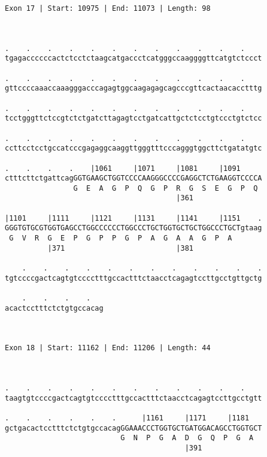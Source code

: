 \documentclass{article}
\begin{document}
\begin{Verbatim}
Exon 17 | Start: 10975 | End: 11073 | Length: 98



.    .    .    .    .    .    .    .    .    .    .    .    
tgagaccccccactctcctctaagcatgaccctcatgggccaaggggttcatgtctccct
                                                            
.    .    .    .    .    .    .    .    .    .    .    .    
gttccccaaaccaaagggacccagagtggcaagagagcagcccgttcactaacacctttg
                                                            
.    .    .    .    .    .    .    .    .    .    .    .    
tcctgggttctccgtctctgatcttagagtcctgatcattgctctcctgtccctgtctcc
                                                            
.    .    .    .    .    .    .    .    .    .    .    .    
ccttcctcctgccatcccgagaggcaaggttgggtttcccagggtggcttctgatatgtc
                                                            
.    .    .    .    |1061     |1071     |1081     |1091     
ctttcttctgattcagGGTGAAGCTGGTCCCCAAGGGCCCCGAGGCTCTGAAGGTCCCCA
                G  E  A  G  P  Q  G  P  R  G  S  E  G  P  Q 
                                        |361                
  
|1101     |1111     |1121     |1131     |1141     |1151    .
GGGTGTGCGTGGTGAGCCTGGCCCCCCTGGCCCTGCTGGTGCTGCTGGCCCTGCTgtaag
 G  V  R  G  E  P  G  P  P  G  P  A  G  A  A  G  P  A       
          |371                          |381                
  
    .    .    .    .    .    .    .    .    .    .    .    .
tgtccccgactcagtgtcccctttgccactttctaacctcagagtccttgcctgttgctg
                                                            
    .    .    .    .   
acactcctttctctgtgccacag
                       
                       
 
Exon 18 | Start: 11162 | End: 11206 | Length: 44



.    .    .    .    .    .    .    .    .    .    .    .    
taagtgtccccgactcagtgtcccctttgccactttctaacctcagagtccttgcctgtt
                                                            
.    .    .    .    .    .      |1161     |1171     |1181   
gctgacactcctttctctgtgccacagGGAAACCCTGGTGCTGATGGACAGCCTGGTGCT
                           G  N  P  G  A  D  G  Q  P  G  A  
                                          |391              
  

\end{Verbatim}
\end{document}
